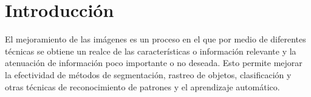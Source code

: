 
\chapter{Introducción}
\label{chp:intro}

%
%
%
%
%

El mejoramiento de las im\'agenes es un proceso en el que por medio de diferentes t\'ecnicas se obtiene un realce de las caracter\'isticas o informaci\'on relevante y la atenuaci\'on de informaci\'on poco importante o no deseada. Esto permite mejorar la efectividad de m\'etodos de segmentaci\'on, rastreo de objetos, clasificaci\'on y otras t\'ecnicas de reconocimiento de patrones y el aprendizaje autom\'atico. 


